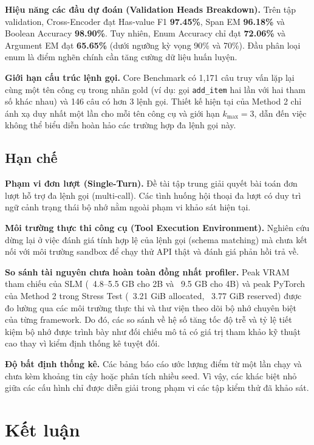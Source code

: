\documentclass[10pt,twocolumn,a4paper]{article}
\begin{document}
\textbf{Hiệu năng các đầu dự đoán (Validation Heads Breakdown).} Trên tập validation, Cross-Encoder đạt Has-value F1 \textbf{97.45\%}, Span EM \textbf{96.18\%} và Boolean Accuracy \textbf{98.90\%}. Tuy nhiên, Enum Accuracy chỉ đạt \textbf{72.06\%} và Argument EM đạt \textbf{65.65\%} (dưới ngưỡng kỳ vọng 90\% và 70\%). Đầu phân loại enum là điểm nghẽn chính cần tăng cường dữ liệu huấn luyện.

\textbf{Giới hạn cấu trúc lệnh gọi.} Core Benchmark có 1,171 câu truy vấn lặp lại cùng một tên công cụ trong nhãn gold (ví dụ: gọi \texttt{add\_item} hai lần với hai tham số khác nhau) và 146 câu có hơn 3 lệnh gọi. Thiết kế hiện tại của Method 2 chỉ ánh xạ duy nhất một lần cho mỗi tên công cụ và giới hạn $k_{\max}=3$, dẫn đến việc không thể biểu diễn hoàn hảo các trường hợp đa lệnh gọi này.

\subsection{Hạn chế}

\textbf{Phạm vi đơn lượt (Single-Turn).} Đề tài tập trung giải quyết bài toán đơn lượt hỗ trợ đa lệnh gọi (multi-call). Các tình huống hội thoại đa lượt có duy trì ngữ cảnh trạng thái bộ nhớ nằm ngoài phạm vi khảo sát hiện tại.

\textbf{Môi trường thực thi công cụ (Tool Execution Environment).} Nghiên cứu dừng lại ở việc đánh giá tính hợp lệ của lệnh gọi (schema matching) mà chưa kết nối với môi trường sandbox để chạy thử API thật và đánh giá phản hồi trả về.

\textbf{So sánh tài nguyên chưa hoàn toàn đồng nhất profiler.} Peak VRAM tham chiếu của SLM (~4.8--5.5 GB cho 2B và ~9.5 GB cho 4B) và peak PyTorch của Method 2 trong Stress Test (~3.21 GiB allocated, ~3.77 GiB reserved) được đo lường qua các môi trường thực thi và thư viện theo dõi bộ nhớ chuyên biệt của từng framework. Do đó, các so sánh về hệ số tăng tốc độ trễ và tỷ lệ tiết kiệm bộ nhớ được trình bày như đối chiếu mô tả có giá trị tham khảo kỹ thuật cao thay vì kiểm định thống kê tuyệt đối.

\textbf{Độ bất định thống kê.} Các bảng báo cáo ước lượng điểm từ một lần chạy và chưa kèm khoảng tin cậy hoặc phân tích nhiều seed. Vì vậy, các khác biệt nhỏ giữa các cấu hình chỉ được diễn giải trong phạm vi các tập kiểm thử đã khảo sát.

\section{Kết luận}
\end{document}
